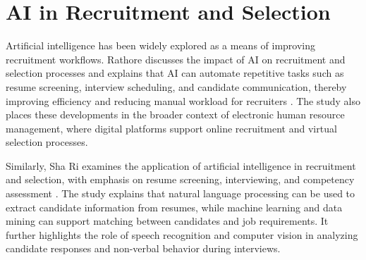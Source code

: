 

\section{AI in Recruitment and Selection}
Artificial intelligence has been widely explored as a means of improving recruitment workflows. Rathore discusses the impact of AI on recruitment and selection processes and explains that AI can automate repetitive tasks such as resume screening, interview scheduling, and candidate communication, thereby improving efficiency and reducing manual workload for recruiters \cite{rathore_ai_recruitment}. The study also places these developments in the broader context of electronic human resource management, where digital platforms support online recruitment and virtual selection processes.

Similarly, Sha Ri examines the application of artificial intelligence in recruitment and selection, with emphasis on resume screening, interviewing, and competency assessment \cite{sha_ri_ai_recruitment}. The study explains that natural language processing can be used to extract candidate information from resumes, while machine learning and data mining can support matching between candidates and job requirements. It further highlights the role of speech recognition and computer vision in analyzing candidate responses and non-verbal behavior during interviews.

